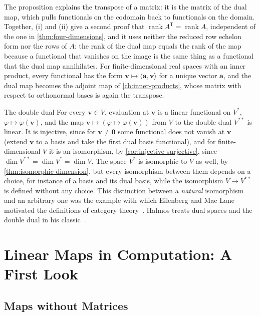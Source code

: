 The proposition explains the transpose of a matrix: it is the matrix of the dual map, which pulls functionals on the codomain back to functionals on the domain. Together, (i) and (ii) give a second proof that $\operatorname{rank}A^{\mathsf T}=\operatorname{rank}A$, independent of the one in \cref{thm:four-dimensions}, and it uses neither the reduced row echelon form nor the rows of $A$: the rank of the dual map equals the rank of the map because a functional that vanishes on the image is the same thing as a functional that the dual map annihilates. For finite-dimensional real spaces with an inner product, every functional has the form $\mathbf v\mapsto\langle\mathbf a,\mathbf v\rangle$ for a unique vector $\mathbf a$, and the dual map becomes the adjoint map of \cref{ch:inner-products}, whose matrix with respect to orthonormal bases is again the transpose.

\begin{note}{The double dual}
For every $\mathbf v\in V$, evaluation at $\mathbf v$ is a linear functional on $V^*$, $\varphi\mapsto\varphi(\mathbf v)$, and the map $\mathbf v\mapsto(\varphi\mapsto\varphi(\mathbf v))$ from $V$ to the double dual $V^{**}$ is linear. It is injective, since for $\mathbf v\ne\mathbf 0$ some functional does not vanish at $\mathbf v$ (extend $\mathbf v$ to a basis and take the first dual basis functional), and for finite-dimensional $V$ it is an isomorphism, by \cref{cor:injective-surjective}, since $\dim V^{**}=\dim V^*=\dim V$. The space $V^*$ is isomorphic to $V$ as well, by \cref{thm:isomorphic-dimension}, but every isomorphism between them depends on a choice, for instance of a basis and its dual basis, while the isomorphism $V\to V^{**}$ is defined without any choice. This distinction between a \emph{natural} isomorphism and an arbitrary one was the example with which Eilenberg and Mac Lane motivated the definitions of category theory~\cite{eilenberg1945}. Halmos treats dual spaces and the double dual in his classic~\cite{halmos1958}.
\end{note}

\section{Linear Maps in Computation: A First Look}
\label{sec:computing-maps}

\subsection{Maps without Matrices}

